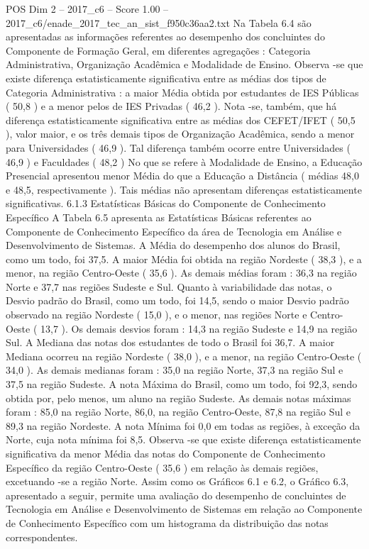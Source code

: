\begin{textsample}{POS Dim 2 – 2017\_c6 – Score 1.00 – 2017\_c6/enade\_2017\_tec\_an\_sist\_f950c36aa2.txt}
Na Tabela 6.4 são apresentadas as informações referentes ao desempenho dos concluintes do Componente de Formação Geral, em diferentes agregações : Categoria Administrativa, Organização Acadêmica e Modalidade de Ensino.
Observa -se que existe diferença estatisticamente significativa entre as médias dos tipos de Categoria Administrativa : a maior Média obtida por estudantes de IES Públicas ( 50,8 ) e a menor pelos de IES Privadas ( 46,2 ).
Nota -se, também, que há diferença estatisticamente significativa entre as médias dos CEFET/IFET ( 50,5 ), valor maior, e os três demais tipos de Organização Acadêmica, sendo a menor para Universidades ( 46,9 ).
Tal diferença também ocorre entre Universidades ( 46,9 ) e Faculdades ( 48,2 ) No que se refere à Modalidade de Ensino, a Educação Presencial apresentou menor Média do que a Educação a Distância ( médias 48,0 e 48,5, respectivamente ).
Tais médias não apresentam diferenças estatisticamente significativas. 6.1.3 Estatísticas Básicas do Componente de Conhecimento Específico A Tabela 6.5 apresenta as Estatísticas Básicas referentes ao Componente de Conhecimento Específico da área de Tecnologia em Análise e Desenvolvimento de Sistemas.
A Média do desempenho dos alunos do Brasil, como um todo, foi 37,5.
A maior Média foi obtida na região Nordeste ( 38,3 ), e a menor, na região Centro-Oeste ( 35,6 ).
As demais médias foram : 36,3 na região Norte e 37,7 nas regiões Sudeste e Sul.
Quanto à variabilidade das notas, o Desvio padrão do Brasil, como um todo, foi 14,5, sendo o maior Desvio padrão observado na região Nordeste ( 15,0 ), e o menor, nas regiões Norte e Centro-Oeste ( 13,7 ).
Os demais desvios foram : 14,3 na região Sudeste e 14,9 na região Sul.
A Mediana das notas dos estudantes de todo o Brasil foi 36,7.
A maior Mediana ocorreu na região Nordeste ( 38,0 ), e a menor, na região Centro-Oeste ( 34,0 ).
As demais medianas foram : 35,0 na região Norte, 37,3 na região Sul e 37,5 na região Sudeste.
A nota Máxima do Brasil, como um todo, foi 92,3, sendo obtida por, pelo menos, um aluno na região Sudeste.
As demais notas máximas foram : 85,0 na região Norte, 86,0, na região Centro-Oeste, 87,8 na região Sul e 89,3 na região Nordeste.
A nota Mínima foi 0,0 em todas as regiões, à exceção da Norte, cuja nota mínima foi 8,5.
Observa -se que existe diferença estatisticamente significativa da menor Média das notas do Componente de Conhecimento Específico da região Centro-Oeste ( 35,6 ) em relação às demais regiões, excetuando -se a região Norte.
Assim como os Gráficos 6.1 e 6.2, o Gráfico 6.3, apresentado a seguir, permite uma avaliação do desempenho de concluintes de Tecnologia em Análise e Desenvolvimento de Sistemas em relação ao Componente de Conhecimento Específico com um histograma da distribuição das notas correspondentes.

\end{textsample}
